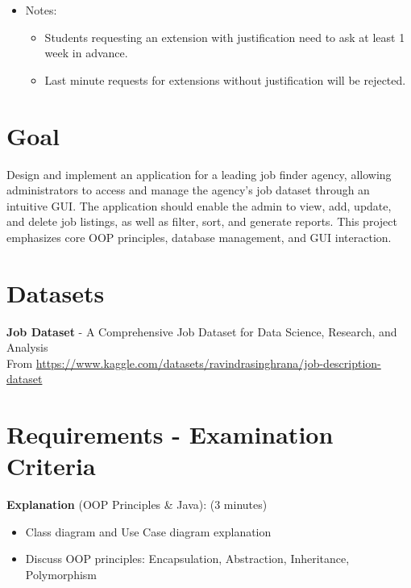\documentclass{article}
\begin{document}
\begin{itemize}
    \item Notes:


    \begin{itemize}


        \item Students requesting an extension with justification need to ask at least 1 week in advance.


        \item Last minute requests for extensions without justification will be rejected.


    \end{itemize}


\end{itemize}






\section*{Goal}


Design and implement an application for a leading job finder agency, allowing administrators to access and manage the agency’s job dataset through an intuitive GUI. The application should enable the admin to view, add, update, and delete job listings, as well as filter, sort, and generate reports. This project emphasizes core OOP principles, database management, and GUI interaction.






\section*{Datasets}


\textbf{Job Dataset} - A Comprehensive Job Dataset for Data Science, Research, and Analysis \\


From \url{https://www.kaggle.com/datasets/ravindrasinghrana/job-description-dataset}






\section*{Requirements - Examination Criteria}


\textbf{Explanation} (OOP Principles \& Java): (3 minutes)


\begin{itemize}


    \item Class diagram and Use Case diagram explanation


    \item Discuss OOP principles: Encapsulation, Abstraction, Inheritance, Polymorphism


\end{itemize}
\end{document}
